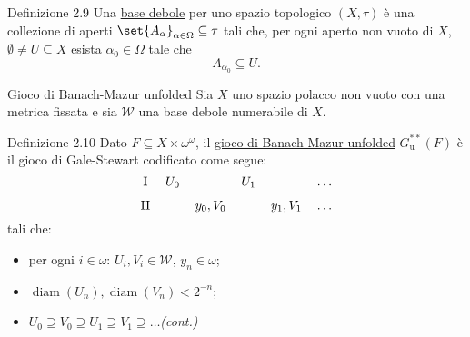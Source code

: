 \documentclass[babel]{beamer}
\renewcommand{\href}[2]{#2}
\begin{document}
\begin{frame}[label={sec:org465e651}]
\begin{block}{Definizione 2.9}
Una \uline{base debole} per uno spazio topologico \((X,\tau)\) è una collezione di aperti \(\set{A_{\alpha}}_{\alpha \in \Omega} \subseteq \tau\) tali che, per ogni aperto non vuoto di \(X\), \(\emptyset\neq U \subseteq X\) esista \(\alpha_{0} \in \Omega\) tale che
\begin{equation*}
A_{\alpha_{0}} \subseteq U.
\end{equation*}
\end{block}
\end{frame}
\begin{frame}[label={sec:org0d0e532}]{Gioco di Banach-Mazur unfolded}
Sia \(X\) uno \href{../../../../../../../org/roam/20250301194013-spazio_polacco.org}{spazio polacco} non vuoto con una \href{../../../../../../../org/roam/20250301193511-spazio_metrico.org}{metrica} fissata e sia \(\mathcal{W}\) una \href{../../../../../../../org/roam/20250525113346-base_debole_di_uno_spazio_topologico.org}{base debole} \href{../../../../../../../org/roam/20250111143651-insieme_numerabile.org}{numerabile} di \(X\).
\begin{block}{Definizione 2.10}
Dato \(F \subseteq X\times \omega^{\omega}\), il \uline{gioco di Banach-Mazur unfolded} \(G^{**}_{\text{u}}(F)\) è il \href{../../../../../../../org/roam/20250513155732-logic_game.org}{gioco} \href{../../../../../../../org/roam/20250513171520-giochi_di_gale_stewart.org}{di Gale-Stewart} codificato come segue:
\begin{equation*}
\begin{tikzcd}[ampersand replacement=\&,cramped,sep=tiny]
	{\text{I}} \& {U_0} \&\& {U_1} \&\& \dots \\
	{\text{II}} \&\& {y_0,V_0} \&\& {y_1, V_{1}} \& \dots
\end{tikzcd}
\end{equation*}
tali che:
\begin{itemize}
\item per ogni \(i \in \omega\): \(U_{i}, V_{i} \in \mathcal{W}\), \(y_{n} \in \omega\);
\item \(\operatorname{diam}(U_{n}), \operatorname{diam}(V_{n}) < 2^{-n}\);
\item \(U_{0}\supseteq V_{0}\supseteq U_{1}\supseteq V_{1}\supseteq \dots\)\hfill \textit{(cont.)}
\end{itemize}
\end{block}
\end{frame}
\end{document}
